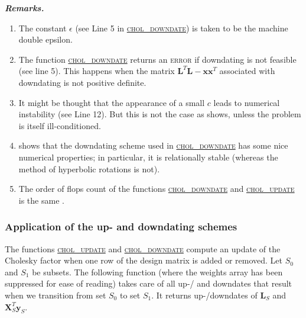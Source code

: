 \documentclass[a4paper,oneside,11pt,DIV=12]{scrartcl}
\begin{document}
\vspace{1em}
\noindent\textbf{\sffamily \small \itshape Remarks.}
\vspace{-0.5em}
\begin{enumerate}
	\item The constant $\epsilon$ (see Line 5 in
		\hyperlink{alg:choldowndate}{\textsc{chol\_downdate}}) is taken
		to be the machine double epsilon.
	\item The function  \hyperlink{alg:choldowndate}{\textsc{chol\_downdate}}
		returns an \textsc{error} if downdating is not feasible (see line 5).
		This happens when the matrix $\bm L^T \bm L - \bm x \bm x^T$
		associated with downdating is not positive definite.
	\item It might be thought that the appearance of a small $c$ leads
		to numerical instability (see Line 12). But this is not the case
		as \citet[][p. 346]{stewart_1998} shows, unless the problem is
		itself ill-conditioned.
	\item \citet[][p. 352]{stewart_1998} shows that the downdating scheme
		used in  \hyperlink{alg:choldowndate}{\textsc{chol\_downdate}} has
		some nice numerical properties; in particular, it is relationally
		stable (whereas the method of hyperbolic rotations is not).
	\item The order of flops count of the functions
		\hyperlink{alg:choldowndate}{\textsc{chol\_downdate}} and
		\hyperlink{alg:cholupdate}{\textsc{chol\_update}} is the same
		\citep[][p. 346]{stewart_1998}.
\end{enumerate}

\subsubsection{Application of the up- and downdating schemes}
The functions \hyperlink{alg:cholupdate}{\textsc{chol\_update}} and
\hyperlink{alg:choldowndate}{\textsc{chol\_downdate}} compute an update
of the Cholesky factor when one row of the design matrix is added or
removed. Let $S_0$ and $S_1$ be subsets. The following function (where the
weights array has been suppressed for ease of reading) takes care of all
up-/ and downdates that result when we transition from set $S_0$ to set
$S_1$. It returns up-/downdates of $\bm L_S$ and $\bm X^T_S\bm y_S$.
\end{document}

